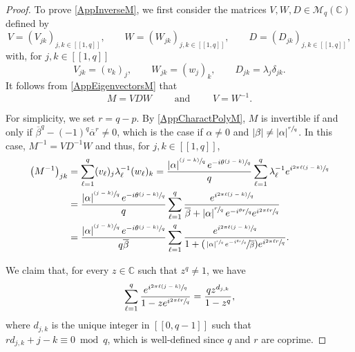 \documentclass[JEP,XML,SOM,Unicode]{cedram}
\newcommand{\psfrac}[2]{\sfrac{(#1)}{#2}}
\newcommand{\Psfrac}[2]{(\sfrac{#1}{#2})}
\newcommand{\llbracket}{[\![}
\newcommand{\rrbracket}{]\!]}
\theoremstyle{plain}
\theoremstyle{definition}
\newcommand{\abs}[1]{\left\lvert #1\right \rvert}
\begin{document}
\begin{proof}
To prove \eqref{AppInverseM}, we first consider the matrices $V, W, D \in \mathcal M_{q}(\mathbb C)$ defined by
\[
V = (V_{jk})_{j, k \in \llbracket 1, q\rrbracket}, \qquad W = (W_{jk})_{j, k \in \llbracket 1, q\rrbracket}, \qquad D = (D_{jk})_{j, k \in \llbracket 1, q\rrbracket},
\]
with, for $j, k \in \llbracket 1, q\rrbracket$
\[
V_{jk} = (v_k)_j, \qquad W_{jk} = (w_j)_k, \qquad D_{jk} = \lambda_j \delta_{jk}.
\]
It follows from \eqref{AppEigenvectorsM} that
\[
M = V D W \qquad \text{ and } \qquad V = W^{-1}.
\]

For simplicity, we set $r\!=\!q - p$. By \eqref{AppCharactPolyM}, $M$ is invertible if and only if \hbox{$\overline\beta^q\!-\!(-1)^q \overline\alpha^r\!\neq\!0$}, which is the case if $\alpha \neq 0$ and $\abs{\beta} \neq \abs{\alpha}^{\sfrac{r}{q}}$. In this case, $M^{-1} = V D^{-1} W$ and thus, for $j, k \in \llbracket 1, q\rrbracket$,
\begin{equation}
\label{DevelopMMinus1}
\begin{aligned}
\left(M^{-1}\right)_{jk} & = \sum_{\ell=1}^q (v_\ell)_j \lambda_\ell^{-1} (w_\ell)_k = \frac{\abs{\alpha}^{\psfrac{j-k}{q}} e^{-i\theta\psfrac{j-k}{q}}}{q} \sum_{\ell=1}^q \lambda_\ell^{-1} e^{i \sfrac{2\pi \ell (j - k)}{q}}\\
& = \frac{\abs{\alpha}^{\psfrac{j-k}{q}} e^{-i\theta\psfrac{j-k}{q}}}{q} \sum_{\ell=1}^q \frac{e^{i \sfrac{2\pi \ell (j - k)}{q}}}{\overline\beta + \abs{\alpha}^{\sfrac{r}{q}} e^{-i\sfrac{\theta r}{q}} e^{i \sfrac{2\pi \ell r}{q}}}\\
&= \frac{\abs{\alpha}^{\psfrac{j-k}{q}} e^{-i\theta\psfrac{j-k}{q}}}{q \overline\beta} \sum_{\ell=1}^q \frac{e^{i \sfrac{2\pi \ell (j - k)}{q}}}{1 + \Psfrac{\abs{\alpha}^{\sfrac{r}{q}} e^{-i\sfrac{\theta r}{q}}}{\overline\beta} e^{i \sfrac{2\pi \ell r}{q}}}.
\end{aligned}
\end{equation}

We claim that, for every $z \in \mathbb C$ such that $z^q \neq 1$, we have
\begin{equation}
\label{CalculSommeMeromorphe}
\sum_{\ell=1}^q \frac{e^{i \sfrac{2\pi \ell (j - k)}{q}}}{1 - z e^{i \sfrac{2 \pi \ell r}{q}}} = \frac{q z^{d_{j, k}}}{1 - z^q},
\end{equation}
where $d_{j, k}$ is the unique integer in $\llbracket 0, q-1\rrbracket$ such that $r d_{j, k} + j - k \equiv 0 \bmod q$, which is well-defined since $q$ and $r$ are coprime.


\end{proof}
\end{document}
